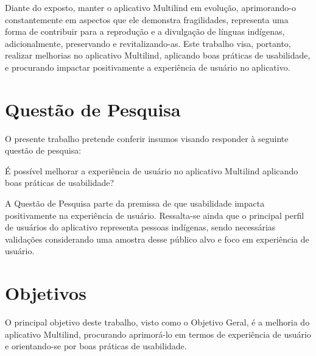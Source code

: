 Diante do exposto, manter o aplicativo Multilind em evolução, aprimorando-o constantemente em aspectos que ele demonstra fragilidades, representa uma forma de
contribuir para a reprodução e a divulgação de línguas indígenas, adicionalmente, preservando e revitalizando-as. Este trabalho visa, portanto,
realizar melhorias no aplicativo Multilind, aplicando boas práticas de usabilidade, e procurando impactar positivamente a experiência de usuário no aplicativo.

\section{Questão de Pesquisa}
\label{sec:QuestaodePesquisa}

O presente trabalho pretende conferir insumos visando responder à seguinte questão de pesquisa:

É  possível melhorar a experiência de usuário no aplicativo Multilind aplicando boas práticas de usabilidade? 

A Questão de Pesquisa parte da premissa de que usabilidade impacta positivamente na experiência de usuário. Ressalta-se ainda que o principal perfil de usuários do aplicativo 
representa pessoas indígenas, sendo necessárias validações considerando uma amostra desse público alvo e foco em experiência de usuário.

\section{Objetivos}
\label{sec:Objetivos}

O principal objetivo deste trabalho, visto como o Objetivo Geral, é a melhoria do aplicativo Multilind, procurando aprimorá-lo em termos de experiência de usuário e
orientando-se por boas práticas de usabilidade. 


